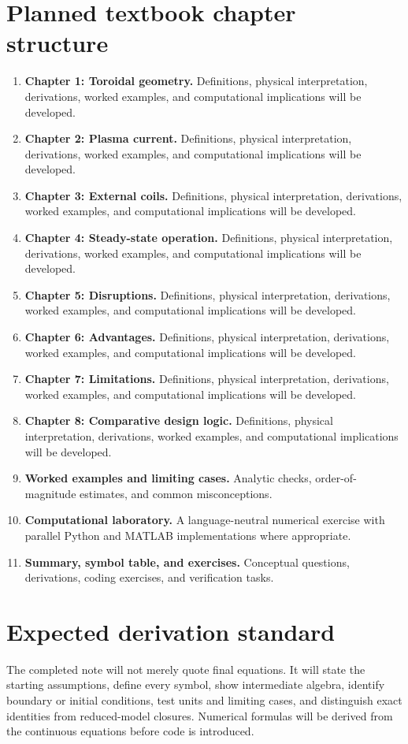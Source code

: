 \documentclass[11pt]{article}
\begin{document}
\section{Planned textbook chapter structure}
\begin{enumerate}[leftmargin=1.8em]
\item \textbf{Chapter 1: Toroidal geometry.} Definitions, physical interpretation, derivations, worked examples, and computational implications will be developed.
\item \textbf{Chapter 2: Plasma current.} Definitions, physical interpretation, derivations, worked examples, and computational implications will be developed.
\item \textbf{Chapter 3: External coils.} Definitions, physical interpretation, derivations, worked examples, and computational implications will be developed.
\item \textbf{Chapter 4: Steady-state operation.} Definitions, physical interpretation, derivations, worked examples, and computational implications will be developed.
\item \textbf{Chapter 5: Disruptions.} Definitions, physical interpretation, derivations, worked examples, and computational implications will be developed.
\item \textbf{Chapter 6: Advantages.} Definitions, physical interpretation, derivations, worked examples, and computational implications will be developed.
\item \textbf{Chapter 7: Limitations.} Definitions, physical interpretation, derivations, worked examples, and computational implications will be developed.
\item \textbf{Chapter 8: Comparative design logic.} Definitions, physical interpretation, derivations, worked examples, and computational implications will be developed.
\item \textbf{Worked examples and limiting cases.} Analytic checks, order-of-magnitude estimates, and common misconceptions.
\item \textbf{Computational laboratory.} A language-neutral numerical exercise with parallel Python and MATLAB implementations where appropriate.
\item \textbf{Summary, symbol table, and exercises.} Conceptual questions, derivations, coding exercises, and verification tasks.
\end{enumerate}

\section{Expected derivation standard}
The completed note will not merely quote final equations. It will state the starting assumptions, define every symbol, show intermediate algebra, identify boundary or initial conditions, test units and limiting cases, and distinguish exact identities from reduced-model closures. Numerical formulas will be derived from the continuous equations before code is introduced.
\end{document}
